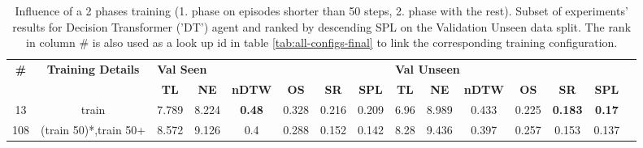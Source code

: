 \begin{table}
\centering
\caption{\label{tab:dt_split_training_50}Influence of a 2 phases training (1. phase on episodes shorter than 50 steps, 2. phase with the rest). Subset of experiments' results for Decision Transformer ('DT') agent and ranked by descending SPL on the Validation Unseen data split. The rank in column \# is also used as a look up id in table \ref{tab:all-configs-final} to link the corresponding training configuration.}
\begin{tabular}{@{\hskip3pt}c@{\hskip3pt}c@{\hskip3pt}c@{\hskip3pt}c@{\hskip3pt}c@{\hskip3pt}c@{\hskip3pt}c@{\hskip3pt}c@{\hskip3pt}c@{\hskip3pt}c@{\hskip3pt}c@{\hskip3pt}c@{\hskip3pt}c@{\hskip3pt}c@{\hskip3pt}c}
\toprule
\textbf{\#} & \textbf{Training Details} & \multicolumn{6}{l}{\textbf{Val Seen}} & \multicolumn{6}{l}{\textbf{Val Unseen}} \\
 \textbf{~} &                \textbf{~} &       \textbf{TL} & \textbf{NE} &  \textbf{nDTW} & \textbf{OS} & \textbf{SR} & \textbf{SPL} &         \textbf{TL} & \textbf{NE} & \textbf{nDTW} & \textbf{OS} &     \textbf{SR} &   \textbf{SPL} \\
\midrule
         13 &                     train &             7.789 &       8.224 &  \textbf{0.48} &       0.328 &       0.216 &        0.209 &                6.96 &       8.989 &         0.433 &       0.225 &  \textbf{0.183} &  \textbf{0.17} \\
        108 &     (train 50)*,train 50+ &             8.572 &       9.126 &            0.4 &       0.288 &       0.152 &        0.142 &                8.28 &       9.436 &         0.397 &       0.257 &           0.153 &          0.137 \\
\bottomrule
\end{tabular}
\end{table}
